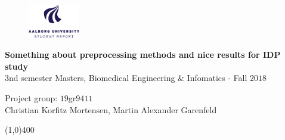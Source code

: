 \clearpage
\thispagestyle{empty}

\begin{figure}[H]
	\raggedleft
	\includegraphics[width=0.2\textwidth]{figures/aaulogo-en.png}
\end{figure} 

\vspace{5 cm}

\begin{center}
	\begin{Huge}
		\textbf{Something about preprocessing methods and nice results for IDP study}\\
		\vspace{5 mm}
		3nd semester Masters, Biomedical Engineering \& Infomatics - Fall $2018$\\
		\vspace{3 mm}
	\end{Huge}
	{\Large Project group: $19$gr$9411$} \\
	\vspace{1cm}
	\large{Christian Korfitz Mortensen, Martin Alexander Garenfeld}
\end{center}
\vspace*{\fill}

\begin{center}
	\line(1,0){400}
\end{center}

%
%
%
%
%	
%	
%	
%
%
%
\newpage
